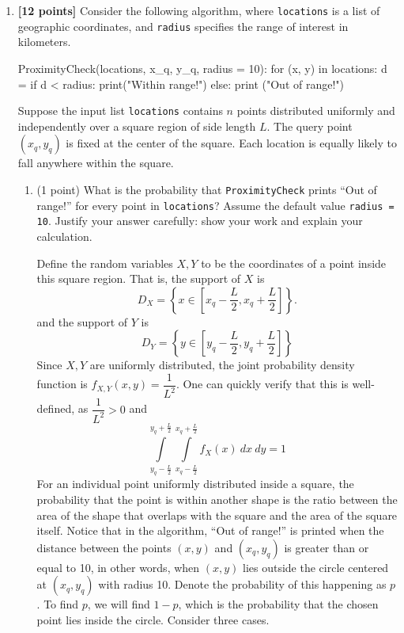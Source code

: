 \documentclass{assignment-263}
\begin{document}
\think
\begin{enumerate}
\item \textbf{[12 points]}
Consider the following algorithm, where \texttt{locations} is a list of geographic coordinates, and \texttt{radius} specifies the range of interest in kilometers.

\begin{python}
ProximityCheck(locations, x_q, y_q, radius = 10):
  for (x, y) in locations:
    d =  
    if d < radius:
      print("Within range!")
    else:
      print ("Out of range!")
\end{python}

Suppose the input list \texttt{locations} contains $n$ points distributed uniformly and independently over a square region of side length $L$. The query point $(x_q, y_q)$ is fixed at the center of the square. Each location is equally likely to fall anywhere within the square.

\begin{enumerate}
    \item (1 point) What is the probability that \texttt{ProximityCheck} prints ``Out of range!'' for every point in \texttt{locations}? Assume the default value \texttt{radius = 10}. Justify your answer carefully: show your work and explain your calculation.
    
    Define the random variables \(X,Y\) to be the coordinates of a point inside this square region. That is, the support of \(X\) is
    \[
      D_X = \left\{x \in \left[x_q - \frac{L}{2}, x_q + \frac{L}{2}\right]\right\}.
    \]
    and the support of \(Y\) is
    \[
      D_Y = \left\{ y \in \left[y_q - \frac{L}{2}, y_q + \frac{L}{2}\right] \right\} 
    \]
    Since \(X,Y\) are uniformly distributed, the joint probability density function is \(f_{X,Y}(x, y) = \dfrac{1}{L^2}\). One can quickly verify that this is well-defined, as \(\dfrac{1}{L^2} > 0\) and
    \[
      \int\limits_{y_q - \frac{L}{2}}^{y_q + \frac{L}{2}} \int\limits_{x_q - \frac{L}{2}}^{x_q + \frac{L}{2}} f_X(x)\ dx\ dy = 1
    \]
    For an individual point uniformly distributed inside a square, the probability that the point is within another shape is the ratio between the area of the shape that overlaps with the square and the area of the square itself. Notice that in the algorithm, ``Out of range!'' is printed when the distance between the points \((x,y)\) and \((x_q, y_q)\) is greater than or equal to 10, in other words, when \((x,y)\) lies outside the circle centered at \((x_q,y_q)\) with radius 10. Denote the probability of this happening as \(p\). To find \(p\), we will find \(1 - p\), which is the probability that the chosen point lies inside the circle. Consider three cases.
    

\end{enumerate}
\end{enumerate}
\end{document}

